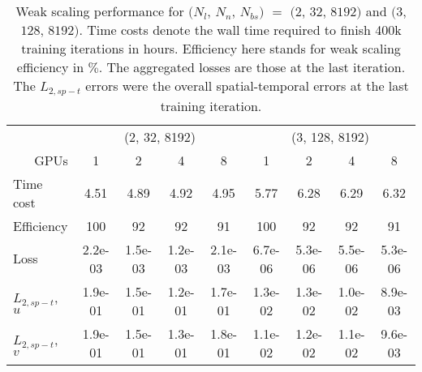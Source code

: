 \begin{table}[hbt!]
\centering
\singlespacing
\caption[
    PINNs, 2D TGV, $Re=100$: weak scaling performance for $(N_l$, $N_n$, $N_{bs})$ $=$ $(2$, $32$, $8192)$ and $(3$, $128$, $8192)$
]{
    Weak scaling performance for $(N_l$, $N_n$, $N_{bs})$ $=$ $(2$, $32$, $8192)$ and $(3$, $128$, $8192)$.%
    Time costs denote the wall time required to finish 400k training iterations in hours.%
    Efficiency here stands for weak scaling efficiency in $\%$.%
    The aggregated losses are those at the last iteration.%
    The $L_{2, sp-t}$ errors were the overall spatial-temporal errors at the last training iteration.%
}
\label{table:weak-scaling-perf}
\begin{tabular}{lcccccccc}
\toprule
 & \multicolumn{4}{c}{(2, 32, 8192)} & \multicolumn{4}{c}{(3, 128, 8192)} \\
\cmidrule(rl){2-5} \cmidrule(rl){6-9}
\multicolumn{1}{r}{GPUs} & 1 & 2 & 4 & 8 & 1 & 2 & 4 & 8 \\
\midrule
Time cost &  4.51 &  4.89 &  4.92 &  4.95 &  5.77 &  6.28 &  6.29 &  6.32 \\
\addlinespace
Efficiency & 100 & 92 & 92 & 91 & 100 & 92 & 92 & 91 \\
\addlinespace
Loss & 2.2e-03 & 1.5e-03 & 1.2e-03 & 2.1e-03 & 6.7e-06 & 5.3e-06 & 5.5e-06 & 5.3e-06 \\
\addlinespace
$L_{2,sp-t}$, $u$ & 1.9e-01 & 1.5e-01 & 1.2e-01 & 1.7e-01 & 1.3e-02 & 1.3e-02 & 1.0e-02 & 8.9e-03 \\
\addlinespace
$L_{2,sp-t}$, $v$ & 1.9e-01 & 1.5e-01 & 1.3e-01 & 1.8e-01 & 1.1e-02 & 1.2e-02 & 1.1e-02 & 9.6e-03 \\
\bottomrule
\end{tabular}
\end{table}

